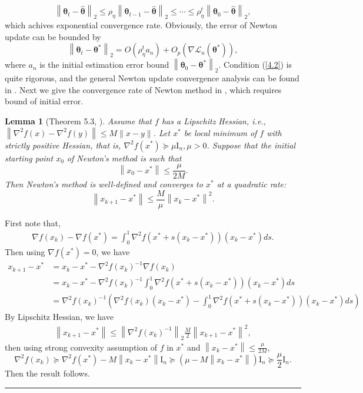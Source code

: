 \documentclass[12pt]{article}
\numberwithin{equation}{section}
\newtheorem{lemma}[theorem]{Lemma}
\newenvironment{proof}{{\bf Proof:}}{\hfill\rule{2mm}{2mm}}
\begin{document}
$$
\left\|\boldsymbol{\theta}_t-\widehat{\boldsymbol{\theta}}\right\|_2\leq \rho_{\eta}\left\|\boldsymbol{\theta}_{t-1}-\widehat{\boldsymbol{\theta}}\right\|_2\leq \cdots \leq \rho_{\eta}^t\left\|\boldsymbol{\theta}_{0}-\widehat{\boldsymbol{\theta}}\right\|_2,
$$
which achives exponential convergence rate. Obviously, the error of Newton update can be bounded by
$$
\left\|\boldsymbol{\theta}_t-\boldsymbol{\theta}^{*}\right\|_2=O\left(\rho_{\eta}^ta_n\right)+O_p\left(\nabla\mathcal{L}_n(\boldsymbol{\theta}^{*})\right),
$$
where $a_n$ is the initial estimation error bound $\left\|\boldsymbol{\theta}_0-\boldsymbol{\theta}^{*}\right\|_2$.
Condition (\ref{4.2}) is quite rigorous, and the general Newton update convergence analysis can be found in \citet{boyd2004convex}. Next we give the convergence rate of Newton method in \citet{bubeck2014theory}, which requires bound of initial error.
\begin{lemma}[Theorem 5.3, \citet{bubeck2014theory}]
	Assume that $f$ has a Lipschitz Hessian, i.e., $\left\|\nabla^{2} f(x)-\nabla^{2} f(y)\right\| \leq M\|x-y\|$. Let $x^{*}$ be local minimum of $f$ with strictly positive Hessian, that is, $\nabla^{2} f\left(x^{*}\right) \succeq \mu \mathrm{I}_{n}, \mu>0$. Suppose that the initial starting point $x_0$ of Newton’s method is such that
	$$
	\left\|x_{0}-x^{*}\right\| \leq \frac{\mu}{2 M}.
	$$
	Then Newton’s method is well-defined and converges to $x^{*}$ at a quadratic rate:
	\begin{equation}
	\left\|x_{k+1}-x^{*}\right\| \leq \frac{M}{\mu}\left\|x_{k}-x^{*}\right\|^{2}.
	\end{equation}
\end{lemma}
\begin{proof}
	First note that,
	\begin{align*}
	\nabla f(x_k) - \nabla f(x^{*}) = \int_{0}^{1}\nabla^2f(x^{*}+s(x_k - x^{*}))(x_k-x^{*})ds.
	\end{align*}
	Then using $\nabla f(x^{*})=0$, we have
	\begin{align*}
	x_{k+1}-x^{*}& = x_{k}-x^{*}-\nabla^2f(x_k)^{-1}\nabla f(x_k)\\
	&=x_{k}-x^{*}-\nabla^2f(x_k)^{-1}\int_{0}^{1}\nabla^2f(x^{*}+s(x_k - x^{*}))(x_k-x^{*})ds\\
	&=\nabla^2f(x_k)^{-1}\left(\nabla^2f(x_k)(x_k-x^{*})-\int_{0}^{1}\nabla^2f(x^{*}+s(x_k - x^{*}))(x_k-x^{*})ds\right)
	\end{align*}
	By Lipschitz Hessian, we have
	\begin{align*}
	\left\|x_{k+1}-x^{*}\right\| \leq \left\|\nabla^2f(x_k)^{-1}\right\|_2 \frac{M}{2}\left\|x_{k+1}-x^{*}\right\|^2,
	\end{align*}
	then using strong convexity assumption of $f$ in $x^{*}$ and $\left\|x_{k}-x^{*}\right\| \leq \frac{\mu}{2 M}$,
	$$
	\nabla^{2} f\left(x_{k}\right) \succeq \nabla^{2} f\left(x^{*}\right)-M\left\|x_{k}-x^{*}\right\| \mathrm{I}_{n} \succeq\left(\mu-M\left\|x_{k}-x^{*}\right\|\right) \mathrm{I}_{n} \succeq \frac{\mu}{2} \mathrm{I}_{n}.
	$$
	Then the result follows.
\end{proof}

\end{document}

